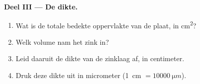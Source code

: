 \begin{problem}
\medskip
\noindent\textbf{Deel III --- De dikte.}
\begin{enumerate}[resume]
  \item Wat is de totale bedekte oppervlakte van de plaat, in
        \unit{cm^2}?
  \item Welk volume nam het zink in?
  \item Leid daaruit de dikte van de zinklaag af, in centimeter.
  \item Druk deze dikte uit in micrometer
        (\qty{1}{cm} $= \qty{10000}{\micro m}$).
\end{enumerate}
\end{problem}
